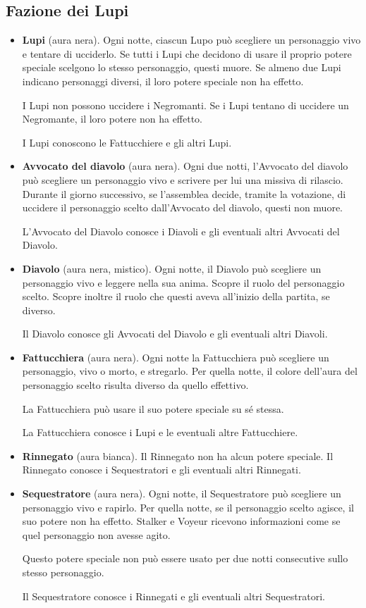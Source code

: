 \documentclass[a4paper,10pt]{article}
\begin{document}
\subsection*{Fazione dei Lupi}

\begin{itemize}
 \item {\bf Lupi} (aura nera). Ogni notte, ciascun Lupo può scegliere un personaggio vivo e tentare di ucciderlo.
 Se tutti i Lupi che decidono di usare il proprio potere speciale scelgono lo stesso personaggio, questi muore.
 Se almeno due Lupi indicano personaggi diversi, il loro potere speciale non ha effetto.
 
 I Lupi non possono uccidere i Negromanti. Se i Lupi tentano di uccidere un Negromante, il loro potere non ha effetto.
 
 I Lupi conoscono le Fattucchiere e gli altri Lupi.

 \item {\bf Avvocato del diavolo} (aura nera). Ogni due notti, l'Avvocato del diavolo può scegliere un personaggio vivo e scrivere per lui una missiva di rilascio.
 Durante il giorno successivo, se l'assemblea decide, tramite la votazione, di uccidere il personaggio scelto dall'Avvocato del diavolo, questi non muore.
 
 L'Avvocato del Diavolo conosce i Diavoli e gli eventuali altri Avvocati del Diavolo.

 \item {\bf Diavolo} (aura nera, mistico). Ogni notte, il Diavolo può scegliere un personaggio vivo e leggere nella sua anima. Scopre il ruolo del personaggio scelto. Scopre inoltre il ruolo che questi aveva all'inizio della partita, se diverso.
 
 Il Diavolo conosce gli Avvocati del Diavolo e gli eventuali altri Diavoli.
 
 \item {\bf Fattucchiera} (aura nera). Ogni notte la Fattucchiera può scegliere un personaggio, vivo o morto, e stregarlo. Per quella notte, il colore dell'aura del personaggio scelto risulta diverso da quello effettivo.
 
 La Fattucchiera può usare il suo potere speciale su sé stessa.
 
 La Fattucchiera conosce i Lupi e le eventuali altre Fattucchiere.
 
 \item {\bf Rinnegato} (aura bianca). Il Rinnegato non ha alcun potere speciale. Il Rinnegato conosce i Sequestratori e gli eventuali altri Rinnegati.

 \item {\bf Sequestratore} (aura nera). Ogni notte, il Sequestratore può scegliere un personaggio vivo e rapirlo. Per quella notte, se il personaggio scelto agisce, il suo potere non ha effetto.
 Stalker e Voyeur ricevono informazioni come se quel personaggio non avesse agito.
 
 Questo potere speciale non può essere usato per due notti consecutive sullo stesso personaggio.
 
 Il Sequestratore conosce i Rinnegati e gli eventuali altri Sequestratori.


\end{itemize}
\end{document}
